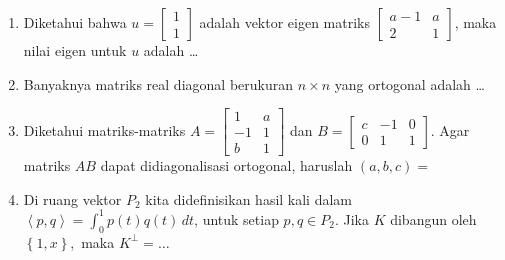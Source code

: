 \documentclass[12pt,twoside]{article}
\begin{document}
\begin{enumerate}
	\item Diketahui bahwa $u = \left[ \begin{array}{c}
				      1 \\1
			      \end{array} \right]$ adalah vektor eigen matriks $\left[ \begin{array}{cc}
				      a-1 & a \\2&1
			      \end{array} \right]$, maka nilai eigen untuk $u$ adalah \dots

	\item Banyaknya matriks real diagonal berukuran $n \times n$ yang ortogonal adalah \dots

	\item Diketahui matriks-matriks $A = \left[ \begin{array}{cc}
				      1 & a \\-1&1\\b&1
			      \end{array} \right]$ dan $B = \left[ \begin{array}{ccc}
				      c & -1 & 0 \\0&1&1
			      \end{array} \right]$. Agar matriks $AB$ dapat didiagonalisasi ortogonal, haruslah $(a,b,c) =$

	\item Di ruang vektor $P_2$ kita didefinisikan hasil kali dalam $\left< p,q \right> = \displaystyle\int_{0}^{1} p(t)q(t)\,dt$, untuk setiap $p,q \in P_2$. Jika $K$ dibangun oleh $\left\lbrace 1, x \right\rbrace,$ maka $K^\perp =\dots$
\end{enumerate}
\end{document}
